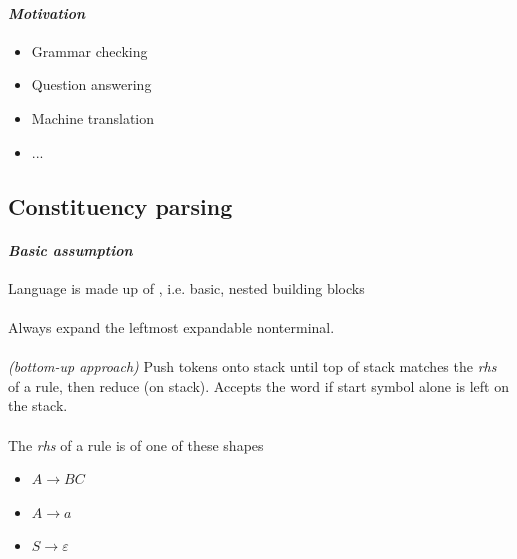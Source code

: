 \documentclass[10pt,twocolumn]{article}
\begin{document}
\paragraph{\textit{Motivation}}
\begin{itemize}
\item Grammar checking
\item Question answering
\item Machine translation
\item ...
\end{itemize}

\subsection{Constituency parsing}

\paragraph{\textit{Basic assumption}} Language is made up of ,
i.e. basic, nested building blocks 

\paragraph{}  Always expand the leftmost expandable
nonterminal. 

\paragraph{} \textit{(bottom-up approach)} Push tokens
onto stack until top of stack matches the \textit{rhs} of a rule, then reduce
(on stack). Accepts the word if start symbol alone is left on the stack.

\paragraph{} The \textit{rhs} of a rule is of one of
these shapes
\begin{itemize}
\item $A \rightarrow BC$
\item $A \rightarrow a$
\item $S \rightarrow \varepsilon$
\end{itemize}
\end{document}
